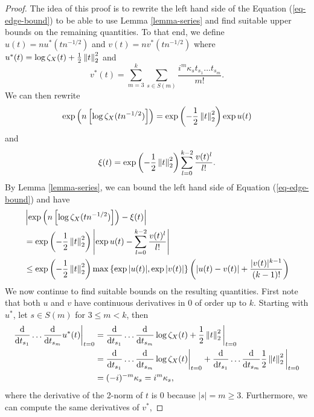 \begin{proof}
    The idea of this proof is to rewrite the left hand side of the Equation (\ref{eq-edge-bound}) to be able to use Lemma \ref{lemma-series} and find suitable upper bounds on the remaining quantities. To that end, we define $u(t) = n u^*(t n^{-1/2})$ and $v(t) = nv^*(t n^{-1/2})$ where $u^*(t) = \log \zeta_X(t) + \frac{1}{2}\left\lVert t\right\rVert_2^2$ and 
    \begin{equation*}
        v^*(t) = \sum_{m=3}^k \sum_{s \in S(m)} \frac{i^m\kappa_s t_{s_1}\ldots t_{s_m}}{m!}.
    \end{equation*}
    We can then rewrite
    \begin{equation*}
        \exp\left(n\left[\log \zeta_X(t n^{-1/2})\right]\right) = \exp\left(-\frac{1}{2}\left\lVert t\right\rVert_2^2\right)\exp u(t)
    \end{equation*}
    and
    \begin{equation*}
        \xi(t) = \exp\left(-\frac{1}{2}\left\lVert t\right\rVert_2^2\right)\sum_{l=0}^{k-2} \frac{v(t)^l}{l!}.
    \end{equation*}
    By Lemma \ref{lemma-series}, we can bound the left hand side of Equation (\ref{eq-edge-bound}) and have
    \begin{align*}
        &\left|\exp\left(n\left[\log \zeta_X(t n^{-1/2})\right]\right) - \xi(t)\right| \\
        &= \exp\left(-\frac{1}{2}\left\lVert t\right\rVert_2^2\right)\left|\exp u(t) - \sum_{l=0}^{k-2} \frac{v(t)^l}{l!}\right|\\
        &\leq \exp\left(-\frac{1}{2}\left\lVert t\right\rVert_2^2\right) \max \left\{ \exp{|u(t)|}, \exp{|v(t)|} \right\}\left(\left|u(t) - v(t)\right| + \frac{|v(t)|^{k-1}}{(k-1)!}\right)
    \end{align*}
    We now continue to find suitable bounds on the resulting quantities. First note that both $u$ and $v$ have continuous derivatives in 0 of order up to $k$. Starting with $u^*$, let $s \in S(m)$ for $3 \leq m < k$, then
    \begin{align*}
        \frac{\text{d}}{\text{d} t_{s_1}}\ldots\frac{\text{d}}{\text{d} t_{s_m}} u^*(t) \bigg|_{t=0}
        &= \frac{\text{d}}{\text{d} t_{s_1}}\ldots\frac{\text{d}}{\text{d} t_{s_m}} \log \zeta_X(t) + \frac{1}{2}\left\lVert t\right\rVert_2^2\bigg|_{t=0}\\
        &=  \frac{\text{d}}{\text{d} t_{s_1}}\ldots\frac{\text{d}}{\text{d} t_{s_m}} \log \zeta_X(t)\bigg|_{t=0}
            +
            \frac{\text{d}}{\text{d} t_{s_1}}\ldots\frac{\text{d}}{\text{d} t_{s_m}} \frac{1}{2}\left\lVert t\right\rVert_2^2\bigg|_{t=0}
        \\
        &= (-i)^{-m}\kappa_s = i^m \kappa_s ,
    \end{align*}
    where the derivative of the 2-norm of $t$ is 0 because $|s| = m \geq 3$. Furthermore, we can compute the same derivatives of $v^*$,

\end{proof}
